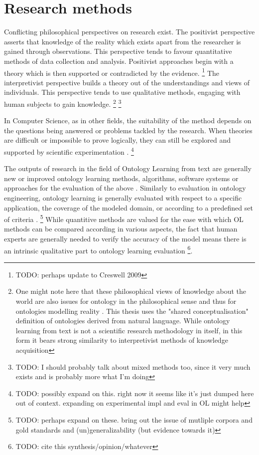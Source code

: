\documentclass[a4paper]{report}
\newcommand{\todo}[1]{\footnote{{\color{red} TODO: #1}}}
\begin{document}
\section{Research methods}

Conflicting philosophical perspectives on research exist.
The positivist perspective asserts that knowledge of the reality which exists apart from the researcher is gained through observations.
This perspective tends to favour quantitative methods of data collection and analysis.
Positivist approaches begin with a theory which is then supported or contradicted by the evidence.
\cite[p.6-7]{creswell2003research}\todo{perhaps update to Creswell 2009}
The interpretivist perspective builds a theory out of the understandings and views of individuals.
This perspective tends to use qualitative methods, engaging with human subjects to gain knowledge.
\cite[p.7-9]{creswell2003research}
\footnote{One might note here that these philosophical views of knowledge about the world are also issues for ontology in the philosophical sense and thus for ontologies modelling reality \cite[p.6]{creswell2003research}\cite{sep-hermeneutics}.
This thesis uses the "shared conceptualisation" definition of ontologies derived from natural language.
While ontology learning from text is not a scientific research methodology in itself, in this form it bears strong similarity to interpretivist methods of knowledge acquisition}
\todo{I should probably talk about mixed methods too, since it very much exists and is probably more what I'm doing}

In Computer Science, as in other fields, the suitability  of the method depends on the questions being answered or problems tackled by the research.
When theories are difficult or impossible to prove logically, they can still be explored and supported by scientific experimentation \cite{Blomqvist09Thesis,Crnkovic2002SciMethCS}.
\todo{possibly expand on this. right now it seems like it's just dumped here out of context. expanding on experimental impl and eval in OL might help}

The outputs of research in the field of Ontology Learning from text are generally new or improved ontology learning methods, algorithms, software systems or approaches for the evaluation of the above \cite{Wong11Survey}.
Similarly to evaluation in ontology engineering, ontology learning is generally evaluated with respect to a specific application, the coverage of the modeled domain, or according to a predefined set of criteria \cite{Wong11Survey}.
\todo{perhaps expand on these. bring out the issue of mutliple corpora and gold standards and (un)generalizability (but evidence towards it)}
While quantitive methods are valued for the ease with which OL methods can be compared according in various aspects, the fact that human experts are generally needed to verify the accuracy of the model means there is an intrinsic qualitative part to ontology learning evaluation \todo{cite this synthesis/opinion/whatever}.
\end{document}

